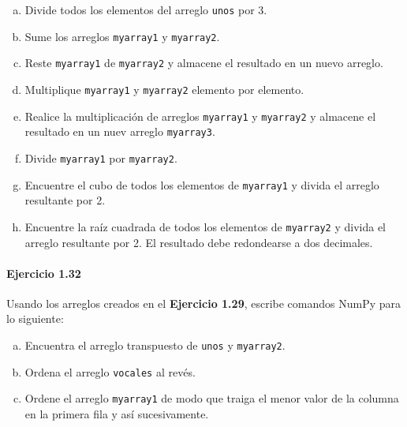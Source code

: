\begin{enumerate}[(a)]
	\item

	      Divide todos los elementos del arreglo
	      \texttt{unos} por 3.

	\item

	      Sume los arreglos \texttt{myarray1} y
	      \texttt{myarray2}.

	\item

	      Reste \texttt{myarray1} de
	      \texttt{myarray2} y almacene el resultado en un
	      nuevo arreglo.

	\item

	      Multiplique \texttt{myarray1} y
	      \texttt{myarray2} elemento por elemento.

	\item

	      Realice la multiplicación de arreglos
	      \texttt{myarray1} y \texttt{myarray2}
	      y almacene el resultado en un nuev arreglo
	      \texttt{myarray3}.

	\item

	      Divide \texttt{myarray1} por
	      \texttt{myarray2}.

	\item

	      Encuentre el cubo de todos los elementos de
	      \texttt{myarray1} y divida el arreglo resultante
	      por 2.

	\item

	      Encuentre la raíz cuadrada de todos los elementos de
	      \texttt{myarray2} y divida el arreglo resultante
	      por 2.
	      El resultado debe redondearse a dos decimales.
\end{enumerate}

\paragraph{\color{DarkBlue}Ejercicio 1.32}
Usando los arreglos creados en el
\textbf{\color{DarkBlue}Ejercicio 1.29}, escribe comandos NumPy para
lo siguiente:

\begin{enumerate}[(a)]
	\item

	      Encuentra el arreglo transpuesto de \texttt{unos}
	      y \texttt{myarray2}.

	\item

	      Ordena el arreglo \texttt{vocales} al revés.

	\item

	      Ordene el arreglo \texttt{myarray1} de modo que
	      traiga el menor valor de la columna en la primera fila y así
	      sucesivamente.
\end{enumerate}

